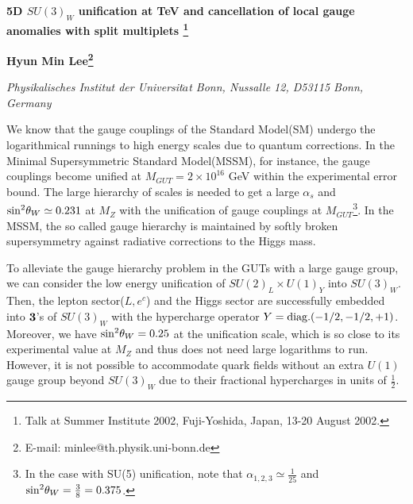 \documentclass[a4paper,11pt]{article}
\begin{document}
\baselineskip 0.6cm

\begin{center}
{\Large \bf 5D $SU(3)_W$ unification at TeV and cancellation of local gauge
anomalies with split multiplets
\footnote{Talk at Summer Institute 2002, Fuji-Yoshida, Japan, 
13-20 August 2002.} }

\vskip 0.5cm

{\large \bf  Hyun Min Lee\footnote{E-mail: minlee@th.physik.uni-bonn.de} }

{\it Physikalisches Institut der Universit${\ddot a}$t Bonn,
Nussalle 12, D53115 Bonn, Germany}

\vskip 0.5cm


\end{center}

\noindent
We know that the gauge couplings of the Standard Model(SM) undergo
the logarithmical runnings to high energy scales
due to quantum corrections.
In the Minimal Supersymmetric Standard Model(MSSM), for instance,
the gauge couplings become unified at $M_{GUT}=2\times 10^{16}$ GeV within the
experimental error bound\cite{gut}.
The large hierarchy of scales is needed to get a large $\alpha_s$ and
${\rm sin}^2\theta_W\simeq 0.231$
at $M_Z$ with the unification of gauge couplings 
at $M_{GUT}$\footnote{In the case with SU(5) unification,
note that $\alpha_{1,2,3}\simeq \frac{1}{25}$ and
${\rm sin}^2\theta_W=\frac{3}{8}=0.375$.}. In the MSSM, the so called gauge
hierarchy is maintained by softly broken supersymmetry against radiative 
corrections to the Higgs mass.

To alleviate the gauge hierarchy problem in the GUTs with a large gauge group,  
we can consider the low energy unification of $SU(2)_L\times U(1)_Y$ into
$SU(3)_W$\cite{weinberg}. 
Then, the lepton sector($L,e^c$) and the Higgs sector
are successfully embedded into $\bf 3$'s
of $SU(3)_W$ with the hypercharge operator $Y={\rm diag.}(-1/2,-1/2,+1)$.
Moreover, we have ${\rm sin}^2\theta_W=0.25$ at the unification
scale, which is so close to its experimental value at $M_Z$ 
and thus does not need large
logarithms to run. However, it is not possible to accommodate quark fields
without an extra $U(1)$ gauge group beyond $SU(3)_W$ due to their fractional
hypercharges in units of $\frac{1}{2}$.
\end{document}
